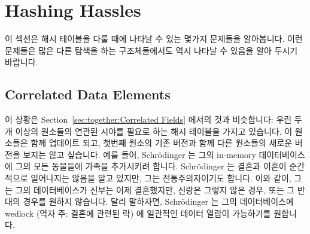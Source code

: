 
\section{Hashing Hassles}
\label{sec:together:Hashing Hassles}

이 섹션은 해시 테이블을 다룰 때에 나타날 수 있는 몇가지 문제들을 알아봅니다.
이런 문제들은 많은 다른 탐색을 하는 구조체들에서도 역시 나타날 수 있음을 알아
두시기 바랍니다.
\iffalse

This section looks at some issues that can arise when dealing with
hash tables.
Please note that these issues also apply to many other search structures.
\fi

\subsection{Correlated Data Elements}
\label{sec:together:Correlated Data Elements}

이 상황은
Section~\ref{sec:together:Correlated Fields} 에서의 것과 비슷합니다:
우린 두개 이상의 원소들의 연관된 시야를 필요로 하는 해시 테이블을 가지고
있습니다.
이 원소들은 함께 업데이트 되고, 첫번째 원소의 기존 버전과 함께 다른 원소들의
새로운 버전을 보지는 않고 싶습니다.
예를 들어, Schr\"odinger 는 그의 in-memory 데이터베이스에 그의 모든 동물들에
가족을 추가시키려 합니다.
Schr\"odinger 는 결혼과 이혼이 순간적으로 일어나지는 않음을 알고 있지만, 그는
전통주의자이기도 합니다.
이와 같이, 그는 그의 데이터베이스가 신부는 이제 결혼했지만, 신랑은 그렇지 않은
경우, 또는 그 반대의 경우를 원하지 않습니다.
달리 말하자면, Schr\"odinger 는 그의 데이터베이스에 wedlock (역자 주: 결혼에
관련된 락) 에 일관적인 데이터 열람이 가능하기를 원합니다.
\iffalse

This situation is analogous to that in
Section~\ref{sec:together:Correlated Fields}:
We have a hash table where we need correlated views of two or more of
the elements.
These elements are updated together, and we do not want to see an old
version of the first element along with new versions of the other
elements.
For example, Schr\"odinger decided to add his extended family to his
in-memory database along with all his animals.
Although Schr\"odinger understands that marriages and divorces do not
happen instantaneously, he is also a traditionalist.
As such, he absolutely does not want his database ever to show that the
bride is now married, but the groom is not, and vice versa.
In other words, Schr\"odinger wants to be able to carry out a
wedlock-consistent traversal of his database.
\fi

